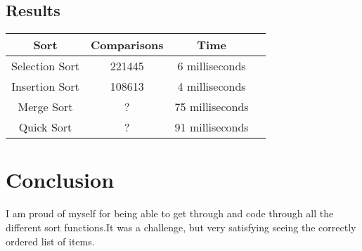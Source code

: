 \documentclass{article}
\begin{document}
\subsection{Results}
\begin{center}
\begin{tabular}{ |c|c|c|c| } 
\hline
Sort & Comparisons & Time \\
\hline
Selection Sort & 221445 & 6 milliseconds \\ 
Insertion Sort & 108613 & 4 milliseconds \\ 
Merge Sort & ? & 75 milliseconds \\ 
Quick Sort & ? & 91 milliseconds \\ 
\hline
\end{tabular}
\end{center}
\section{Conclusion}
I am proud of myself for being able to get through and code through all the different sort functions.It was a challenge, but very satisfying seeing the correctly ordered list of items.
\end{document}

